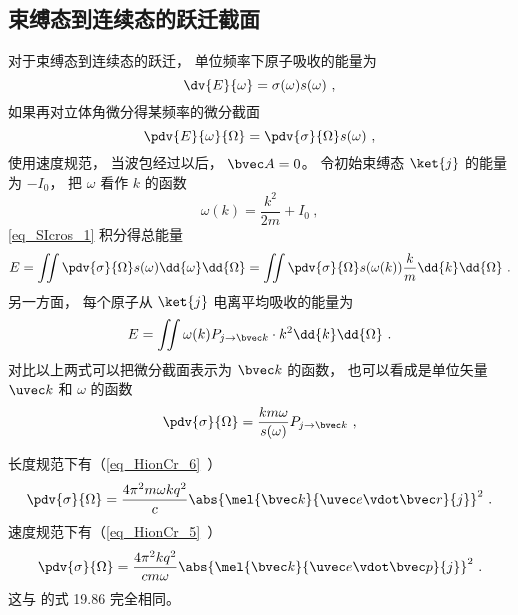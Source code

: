\subsection{束缚态到连续态的跃迁截面}
对于束缚态到连续态的跃迁， 单位频率下原子吸收的能量为
\begin{equation}
\dv{E}{\omega} = \sigma(\omega) s(\omega)~,
\end{equation}
如果再对立体角微分得某频率的微分截面 %
\begin{equation}\label{eq_SIcros_1}
\pdv{E}{\omega}{\Omega} = \pdv{\sigma}{\Omega} s(\omega)~,
\end{equation}
使用速度规范， 当波包经过以后， $\bvec A = 0$。 令初始束缚态 $\ket{j}$ 的能量为 $-I_0$， 把 $\omega$ 看作 $k$ 的函数
\begin{equation}
\omega(k) = \frac{k^2}{2m} + I_0~,
\end{equation}
\autoref{eq_SIcros_1} 积分得总能量
\begin{equation}
E = \iint \pdv{\sigma}{\Omega} s(\omega) \dd{\omega}\dd{\Omega} = \iint \pdv{\sigma}{\Omega} s(\omega(k)) \frac{k}{m}\dd{k}\dd{\Omega}~.
\end{equation}
另一方面， 每个原子从 $\ket{j}$ 电离平均吸收的能量为
\begin{equation}
E = \iint \omega(k) P_{j\to {\bvec k}} \cdot k^2 \dd{k}\dd{\Omega}~.
\end{equation}
对比以上两式可以把微分截面表示为 $\bvec k$ 的函数， 也可以看成是单位矢量 $\uvec k$ 和 $\omega$ 的函数
\begin{equation}
\pdv{\sigma}{\Omega} = \frac{km \omega}{s(\omega)} P_{j\to \bvec k}~,
\end{equation}

长度规范下有（\autoref{eq_HionCr_6}~）
\begin{equation}
\pdv{\sigma}{\Omega} = \frac{4\pi^2 m\omega k q^2}{c} \abs{\mel{\bvec k}{\uvec e \vdot\bvec r}{j}}^2~.
\end{equation}
速度规范下有（\autoref{eq_HionCr_5}~）
\begin{equation}\label{eq_SIcros_8}
\pdv{\sigma}{\Omega} = \frac{4\pi^2 k q^2}{c m \omega} \abs{\mel{\bvec k}{\uvec e \vdot \bvec p}{j}}^2~.
\end{equation}
这与 \cite{Merzbacher} 的式 19.86 完全相同。
